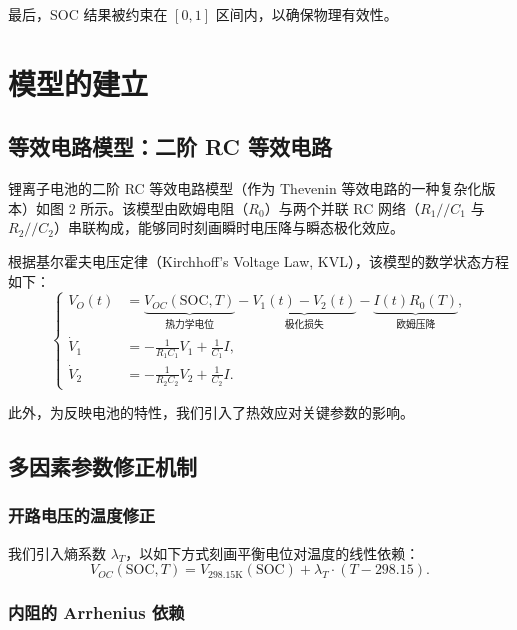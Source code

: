 \documentclass[11pt,a4paper]{ctexart}
\begin{document}
最后，SOC 结果被约束在 $[0,1]$ 区间内，以确保物理有效性。

\section{模型的建立}

\subsection{等效电路模型：二阶 RC 等效电路}

锂离子电池的二阶 RC 等效电路模型（作为 Thevenin 等效电路的一种复杂化版本）如图 2 所示。该模型由欧姆电阻（$R_0$）与两个并联 RC 网络（$R_1//C_1$ 与 $R_2//C_2$）串联构成，能够同时刻画瞬时电压降与瞬态极化效应。

根据基尔霍夫电压定律（Kirchhoff's Voltage Law, KVL），该模型的数学状态方程如下：
\begin{equation}
\left\{
\begin{aligned}
V_O(t) &= \underbrace{V_{OC}(\mathrm{SOC},T)}_{\text{热力学电位}} - \underbrace{V_1(t)-V_2(t)}_{\text{极化损失}} - \underbrace{I(t)R_0(T)}_{\text{欧姆压降}},\\[4pt]
\dot{V}_1 &= -\frac{1}{R_1C_1}V_1 + \frac{1}{C_1}I,\\[4pt]
\dot{V}_2 &= -\frac{1}{R_2C_2}V_2 + \frac{1}{C_2}I.
\end{aligned}
\right.
\end{equation}

此外，为反映电池的特性，我们引入了热效应对关键参数的影响。

\subsection{多因素参数修正机制}

\subsubsection{开路电压的温度修正}

我们引入熵系数 $\lambda_T$，以如下方式刻画平衡电位对温度的线性依赖：
\begin{equation}
V_{OC}(\mathrm{SOC},T) = V_{298.15\mathrm{K}}(\mathrm{SOC}) + \lambda_T\cdot(T-298.15).
\end{equation}

\subsubsection{内阻的 Arrhenius 依赖}
\end{document}
